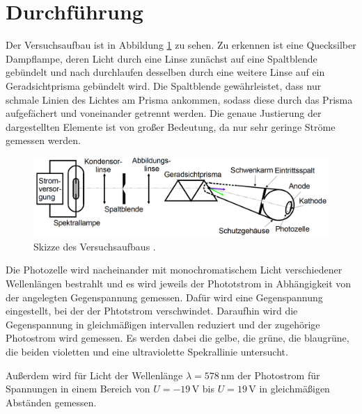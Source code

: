 \section{Durchführung}
\label{sec:Durchführung}

Der Versuchsaufbau ist in Abbildung \ref{fig:aufbau} zu sehen. Zu erkennen ist eine
Quecksilber Dampflampe, deren Licht durch eine Linse zunächst auf eine Spaltblende
gebündelt und nach durchlaufen desselben durch eine weitere Linse auf ein
Geradsichtprisma gebündelt wird. Die Spaltblende gewährleistet, dass nur schmale Linien
des Lichtes am Prisma ankommen, sodass diese durch das Prisma aufgefächert und voneinander getrennt
werden. Die genaue Justierung der dargestellten Elemente ist von großer Bedeutung,
da nur sehr geringe Ströme gemessen werden.

\begin{figure}
  \centering
  \includegraphics[width=\textwidth]{data/aufbau.png}
  \caption{Skizze des Versuchsaufbaus \cite{Versuchsanleitung}.}
  \label{fig:aufbau}
\end{figure}

Die Photozelle wird nacheinander mit monochromatischem Licht verschiedener Wellenlängen
bestrahlt und es wird jeweils der Phototstrom in Abhängigkeit von der angelegten
Gegenspannung gemessen. Dafür wird eine Gegenspannung eingestellt, bei der der
Phtotstrom verschwindet. Daraufhin wird die Gegenspannung in gleichmäßigen intervallen
reduziert und der zugehörige Photostrom wird gemessen. Es werden dabei die gelbe,
die grüne, die blaugrüne, die beiden violetten und eine ultraviolette Spekrallinie
untersucht.

Außerdem wird für Licht der Wellenlänge $\lambda=578\,$nm der Photostrom für Spannungen
in einem Bereich von $U=-19\,$V bis $U=19\,$V in gleichmäßigen Abständen gemessen.
